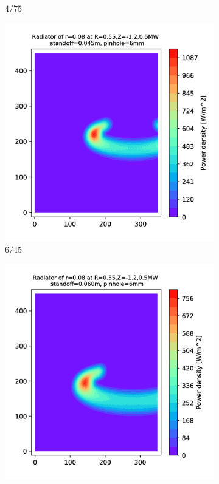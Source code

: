 \begin{figure}
\begin{subfigure}{0.325\textwidth}
         \caption{$4/75$}
         \label{fig:$4_75$}
     \end{subfigure}
     \begin{subfigure}{0.3\textwidth}
         \centering
         \includegraphics[trim={70 0 110 0},clip,width=\textwidth]{Chapters/appendix1/figs/6_45.png}
         \caption{$6/45$}
         \label{fig:6_45}
     \end{subfigure}
     \hfill
     \begin{subfigure}{0.3\textwidth}
         \centering
         \includegraphics[trim={70 0 125 0},clip,width=\textwidth]{Chapters/appendix1/figs/6_60.png}

\end{subfigure}
\end{figure}

